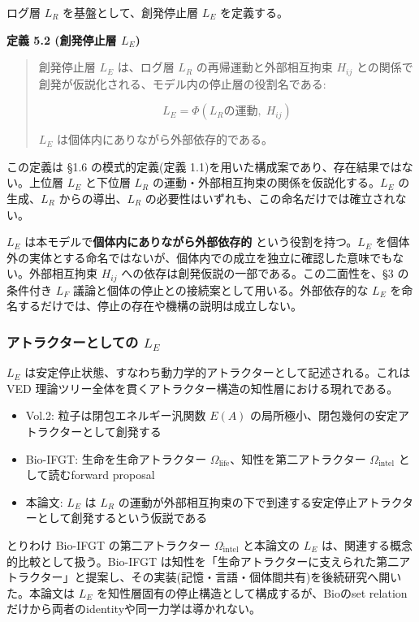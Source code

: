 ログ層 $L_R$ を基盤として、創発停止層 $L_E$ を定義する。

\textbf{定義 5.2 (創発停止層 $L_E$)}

\begin{quote}
創発停止層 $L_E$ は、ログ層 $L_R$ の再帰運動と外部相互拘束 $H_{ij}$ との関係で創発が仮説化される、モデル内の停止層の役割名である:

$$
L_E = \Phi(L_R \text{の運動}, \; H_{ij})
$$

$L_E$ は個体内にありながら外部依存的である。
\end{quote}


この定義は \S{}1.6 の模式的定義(定義 1.1)を用いた構成案であり、存在結果ではない。上位層 $L_E$ と下位層 $L_R$ の運動・外部相互拘束の関係を仮説化する。$L_E$ の生成、$L_R$ からの導出、$L_R$ の必要性はいずれも、この命名だけでは確立されない。

$L_E$ は本モデルで\textbf{個体内にありながら外部依存的} という役割を持つ。$L_E$ を個体外の実体とする命名ではないが、個体内での成立を独立に確認した意味でもない。外部相互拘束 $H_{ij}$ への依存は創発仮説の一部である。この二面性を、\S{}3 の条件付き $L_F$ 議論と個体の停止との接続案として用いる。外部依存的な $L_E$ を命名するだけでは、停止の存在や機構の説明は成立しない。

\subsubsection{アトラクターとしての $L_E$}


$L_E$ は安定停止状態、すなわち動力学的アトラクターとして記述される。これは VED 理論ツリー全体を貫くアトラクター構造の知性層における現れである。

\begin{itemize}
\item Vol.2: 粒子は閉包エネルギー汎関数 $E(A)$ の局所極小、閉包幾何の安定アトラクターとして創発する
\item Bio-IFGT: 生命を生命アトラクター $\Omega_{\text{life}}$、知性を第二アトラクター $\Omega_{\text{intel}}$ として読むforward proposal
\item 本論文: $L_E$ は $L_R$ の運動が外部相互拘束の下で到達する安定停止アトラクターとして創発するという仮説である
\end{itemize}


とりわけ Bio-IFGT の第二アトラクター $\Omega_{\text{intel}}$ と本論文の $L_E$ は、関連する概念的比較として扱う。Bio-IFGT は知性を「生命アトラクターに支えられた第二アトラクター」と提案し、その実装(記憶・言語・個体間共有)を後続研究へ開いた。本論文は $L_E$ を知性層固有の停止構造として構成するが、Bioのset relationだけから両者のidentityや同一力学は導かれない。

